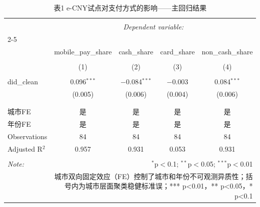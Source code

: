 
\begin{table}[!htbp] \centering 
  \caption{表1  e-CNY试点对支付方式的影响——主回归结果} 
  \label{tab:main_results} 
\begin{tabular}{@{\extracolsep{5pt}}lcccc} 
\\[-1.8ex]\hline 
\hline \\[-1.8ex] 
 & \multicolumn{4}{c}{\textit{Dependent variable:}} \\ 
\cline{2-5} 
\\[-1.8ex] & mobile\_pay\_share & cash\_share & card\_share & non\_cash\_share \\ 
\\[-1.8ex] & (1) & (2) & (3) & (4)\\ 
\hline \\[-1.8ex] 
 did\_clean & 0.096$^{***}$ & $-$0.084$^{***}$ & $-$0.003 & 0.084$^{***}$ \\ 
  & (0.005) & (0.006) & (0.004) & (0.006) \\ 
  & & & & \\ 
\hline \\[-1.8ex] 
城市FE & 是 & 是 & 是 & 是 \\ 
年份FE & 是 & 是 & 是 & 是 \\ 
Observations & 84 & 84 & 84 & 84 \\ 
Adjusted R$^{2}$ & 0.957 & 0.931 & 0.053 & 0.931 \\ 
\hline 
\hline \\[-1.8ex] 
\textit{Note:}  & \multicolumn{4}{r}{$^{*}$p$<$0.1; $^{**}$p$<$0.05; $^{***}$p$<$0.01} \\ 
 & \multicolumn{4}{r}{城市双向固定效应（FE）控制了城市和年份不可观测异质性；括号内为城市层面聚类稳健标准误；*** p<0.01，** p<0.05，* p<0.1} \\ 
\end{tabular} 
\end{table} 
